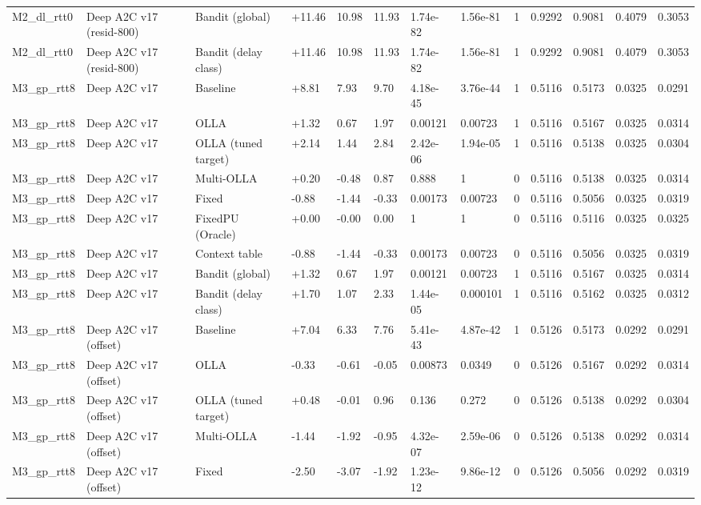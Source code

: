 \documentclass[10pt]{article}
\begin{document}
\begin{landscape}
\begin{longtable}{@{}lllllllllllll@{}}
M2\_dl\_rtt0 & Deep A2C v17 (resid-800) & Bandit (global) & +11.46 & 10.98 & 11.93 & 1.74e-82 & 1.56e-81 & 1 & 0.9292 & 0.9081 & 0.4079 & 0.3053 \\
M2\_dl\_rtt0 & Deep A2C v17 (resid-800) & Bandit (delay class) & +11.46 & 10.98 & 11.93 & 1.74e-82 & 1.56e-81 & 1 & 0.9292 & 0.9081 & 0.4079 & 0.3053 \\
M3\_gp\_rtt8 & Deep A2C v17 & Baseline & +8.81 & 7.93 & 9.70 & 4.18e-45 & 3.76e-44 & 1 & 0.5116 & 0.5173 & 0.0325 & 0.0291 \\
M3\_gp\_rtt8 & Deep A2C v17 & OLLA & +1.32 & 0.67 & 1.97 & 0.00121 & 0.00723 & 1 & 0.5116 & 0.5167 & 0.0325 & 0.0314 \\
M3\_gp\_rtt8 & Deep A2C v17 & OLLA (tuned target) & +2.14 & 1.44 & 2.84 & 2.42e-06 & 1.94e-05 & 1 & 0.5116 & 0.5138 & 0.0325 & 0.0304 \\
M3\_gp\_rtt8 & Deep A2C v17 & Multi-OLLA & +0.20 & -0.48 & 0.87 & 0.888 & 1 & 0 & 0.5116 & 0.5138 & 0.0325 & 0.0314 \\
M3\_gp\_rtt8 & Deep A2C v17 & Fixed & -0.88 & -1.44 & -0.33 & 0.00173 & 0.00723 & 0 & 0.5116 & 0.5056 & 0.0325 & 0.0319 \\
M3\_gp\_rtt8 & Deep A2C v17 & FixedPU (Oracle) & +0.00 & -0.00 & 0.00 & 1 & 1 & 0 & 0.5116 & 0.5116 & 0.0325 & 0.0325 \\
M3\_gp\_rtt8 & Deep A2C v17 & Context table & -0.88 & -1.44 & -0.33 & 0.00173 & 0.00723 & 0 & 0.5116 & 0.5056 & 0.0325 & 0.0319 \\
M3\_gp\_rtt8 & Deep A2C v17 & Bandit (global) & +1.32 & 0.67 & 1.97 & 0.00121 & 0.00723 & 1 & 0.5116 & 0.5167 & 0.0325 & 0.0314 \\
M3\_gp\_rtt8 & Deep A2C v17 & Bandit (delay class) & +1.70 & 1.07 & 2.33 & 1.44e-05 & 0.000101 & 1 & 0.5116 & 0.5162 & 0.0325 & 0.0312 \\
M3\_gp\_rtt8 & Deep A2C v17 (offset) & Baseline & +7.04 & 6.33 & 7.76 & 5.41e-43 & 4.87e-42 & 1 & 0.5126 & 0.5173 & 0.0292 & 0.0291 \\
M3\_gp\_rtt8 & Deep A2C v17 (offset) & OLLA & -0.33 & -0.61 & -0.05 & 0.00873 & 0.0349 & 0 & 0.5126 & 0.5167 & 0.0292 & 0.0314 \\
M3\_gp\_rtt8 & Deep A2C v17 (offset) & OLLA (tuned target) & +0.48 & -0.01 & 0.96 & 0.136 & 0.272 & 0 & 0.5126 & 0.5138 & 0.0292 & 0.0304 \\
M3\_gp\_rtt8 & Deep A2C v17 (offset) & Multi-OLLA & -1.44 & -1.92 & -0.95 & 4.32e-07 & 2.59e-06 & 0 & 0.5126 & 0.5138 & 0.0292 & 0.0314 \\
M3\_gp\_rtt8 & Deep A2C v17 (offset) & Fixed & -2.50 & -3.07 & -1.92 & 1.23e-12 & 9.86e-12 & 0 & 0.5126 & 0.5056 & 0.0292 & 0.0319 \\

\end{longtable}
\end{landscape}
\end{document}
